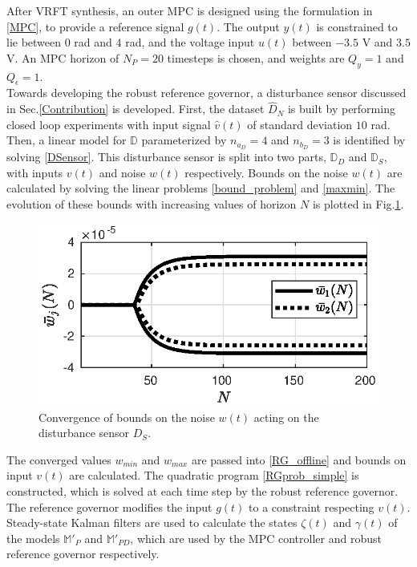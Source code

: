 \documentclass[letterpaper, 10 pt, conference]{ieeeconf}  %
\begin{document}
\begin{enumerate}
	After VRFT synthesis, an outer MPC is designed using the formulation in \eqref{MPC}, to provide a reference signal $g(t)$. The output $y(t)$ is constrained to lie between $0$ rad and $4$ rad, and the voltage input $u(t)$ between $-3.5$ V and $3.5$ V. An MPC horizon of $N_P=20$ timesteps is chosen, and weights are $Q_y=1$ and $Q_{\epsilon}=1$. \\
	Towards developing the robust reference governor, a disturbance sensor discussed in Sec.\ref{Contribution} is developed. First, the dataset $\hat{D}_N$ is built by performing closed loop experiments with input signal $\hat{v}(t)$ of standard deviation $10$ rad. Then, a linear model for $\mathbb{D}$ parameterized by $n_{a_D} = 4$ and $n_{b_D} = 3$ is identified by solving \eqref{DSensor}. This disturbance sensor is split into two parts, $\mathbb{D}_D$ and $\mathbb{D}_S$, with inputs $v(t)$ and noise $w(t)$ respectively. Bounds on the noise $w(t)$ are calculated by solving the linear problems \eqref{bound_problem} and \eqref{maxmin}. The evolution of these bounds with increasing values of horizon $N$ is plotted in Fig.\ref{bounds_RG}.
	\begin{figure}[h]
		\hspace{30pt}
		\includegraphics[scale = 0.6]{bounds_RG.eps}
		\caption{Convergence of bounds on the noise $w(t)$ acting on the disturbance sensor $D_S$.}
		\label{bounds_RG}
	\end{figure}
	The converged values $w_{min}$ and $w_{max}$ are passed into \eqref{RG_offline} and bounds on input $v(t)$ are calculated. The quadratic program \eqref{RGprob_simple} is constructed, which is solved at each time step by the robust reference governor. The reference governor modifies the input $g(t)$ to a constraint respecting $v(t)$. Steady-state Kalman filters are used to calculate the states $\zeta(t)$ and $\gamma(t)$ of the models $\mathbb{M}'_P$ and $\mathbb{M}'_{PD}$, which are used by the MPC controller and robust reference governor respectively.

\end{enumerate}
\end{document}
